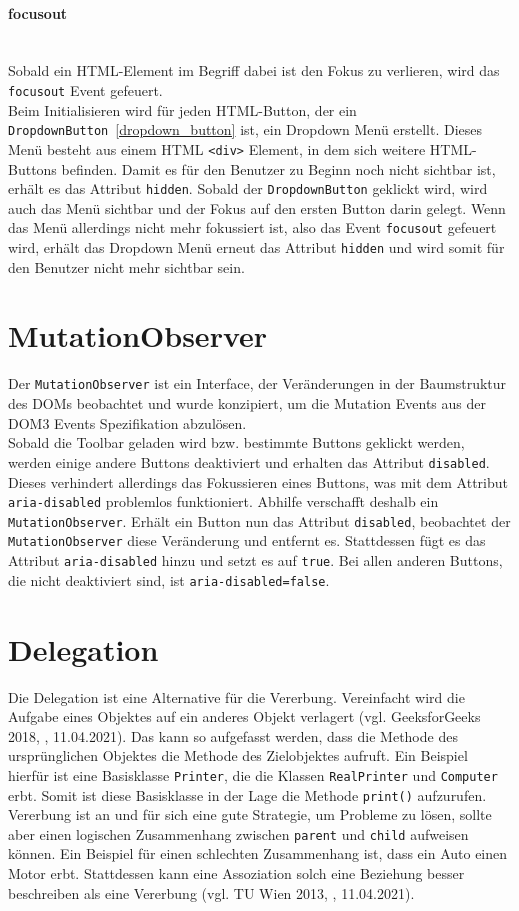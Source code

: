 \paragraph{focusout}\mbox{}\\
Sobald ein HTML-Element im Begriff dabei ist den Fokus zu verlieren, wird das \texttt{focusout} Event gefeuert.\\
Beim Initialisieren wird für jeden HTML-Button, der ein \texttt{DropdownButton}~\ref{dropdown_button} ist,  ein Dropdown Menü erstellt. Dieses Menü besteht aus einem HTML  \texttt{<div>} Element, in dem sich weitere HTML-Buttons befinden. Damit es für den Benutzer zu Beginn noch nicht sichtbar ist, erhält es das Attribut \texttt{hidden}. Sobald der \texttt{DropdownButton} geklickt wird, wird auch das Menü sichtbar und der Fokus auf den ersten Button darin gelegt. Wenn das Menü allerdings nicht mehr fokussiert ist, also das Event \texttt{focusout} gefeuert wird, erhält das Dropdown Menü erneut das Attribut \texttt{hidden} und wird somit für den Benutzer nicht mehr sichtbar sein.

\section{MutationObserver}
Der \texttt{MutationObserver} ist ein Interface, der Veränderungen in der Baumstruktur des DOMs beobachtet und wurde konzipiert, um die Mutation Events aus der DOM3 Events Spezifikation abzulösen.\\
Sobald die Toolbar geladen wird bzw. bestimmte Buttons geklickt werden, werden einige andere Buttons deaktiviert und erhalten das Attribut \texttt{disabled}. Dieses verhindert allerdings das Fokussieren eines Buttons, was mit dem Attribut \texttt{aria-disabled} problemlos funktioniert. Abhilfe verschafft deshalb ein \texttt{MutationObserver}. Erhält ein Button nun das Attribut \texttt{disabled}, beobachtet der \texttt{MutationObserver} diese Veränderung und entfernt es. Stattdessen fügt es das Attribut \texttt{aria-disabled} hinzu und setzt es auf \texttt{true}. Bei allen anderen Buttons, die nicht deaktiviert sind, ist \texttt{aria-disabled=false}.

\section{Delegation}
Die Delegation ist eine Alternative für die Vererbung. Vereinfacht wird die Aufgabe eines Objektes auf ein anderes Objekt verlagert (vgl. GeeksforGeeks 2018, \cite{delegation_2018}, 11.04.2021). Das kann so aufgefasst werden, dass die Methode des ursprünglichen Objektes die Methode des Zielobjektes aufruft. Ein Beispiel hierfür ist eine Basisklasse \texttt{Printer}, die die Klassen \texttt{RealPrinter} und \texttt{Computer} erbt. Somit ist diese Basisklasse in der Lage die Methode \texttt{print()} aufzurufen. Vererbung ist an und für sich eine gute Strategie, um Probleme zu lösen, sollte aber einen logischen Zusammenhang zwischen \texttt{parent} und \texttt{child} aufweisen können. Ein Beispiel für einen schlechten Zusammenhang ist, dass ein Auto einen Motor erbt. Stattdessen kann eine Assoziation solch eine Beziehung besser beschreiben als eine Vererbung (vgl. TU Wien 2013, \cite{tuv_delegation_2013}, 11.04.2021).

